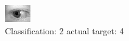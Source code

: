 \begin{figure}[h!]
\begin{center}
\includegraphics[width=0.60\columnwidth]{figures/ID780_class_2_target_4.png}
\end{center}
\caption{ Classification: 2 actual target: 4}
\label{fig:ID780_class_2_target_4}
\end{figure}
